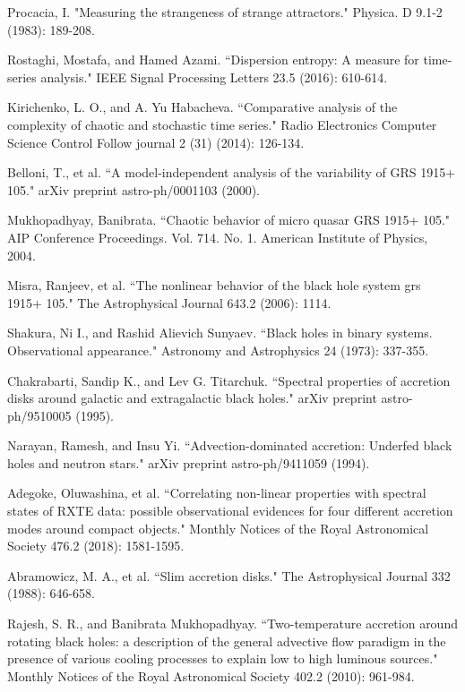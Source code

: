 \documentclass[journal]{IEEEtran}
\begin{document}
	\begin{thebibliography}{1}
		Procacia, I. "Measuring the strangeness of strange attractors." Physica. D 9.1-2 (1983): 189-208.

		Rostaghi, Mostafa, and Hamed Azami. ``Dispersion entropy: A measure for time-series analysis." IEEE Signal Processing Letters 23.5 (2016): 610-614.

Kirichenko, L. O., and A. Yu Habacheva. ``Comparative analysis of the complexity of chaotic and stochastic time series." Radio Electronics Computer Science Control  Follow journal 2 (31) (2014): 126-134.

Belloni, T., et al. ``A model-independent analysis of the variability of GRS 1915+ 105." arXiv preprint astro-ph/0001103 (2000).

Mukhopadhyay, Banibrata. ``Chaotic behavior of micro quasar GRS 1915+ 105." AIP Conference Proceedings. Vol. 714. No. 1. American Institute of Physics, 2004.

Misra, Ranjeev, et al. ``The nonlinear behavior of the black hole system grs 1915+ 105." The Astrophysical Journal 643.2 (2006): 1114.

Shakura, Ni I., and Rashid Alievich Sunyaev. ``Black holes in binary systems. Observational appearance." Astronomy and Astrophysics 24 (1973): 337-355.

Chakrabarti, Sandip K., and Lev G. Titarchuk. ``Spectral properties of accretion disks around galactic and extragalactic black holes." arXiv preprint astro-ph/9510005 (1995).

Narayan, Ramesh, and Insu Yi. ``Advection-dominated accretion: Underfed black holes and neutron stars." arXiv preprint astro-ph/9411059 (1994).

Adegoke, Oluwashina, et al. ``Correlating non-linear properties with spectral states of RXTE data: possible observational evidences for four different accretion modes around compact objects." Monthly Notices of the Royal Astronomical Society 476.2 (2018): 1581-1595.

Abramowicz, M. A., et al. ``Slim accretion disks." The Astrophysical Journal 332 (1988): 646-658.

Rajesh, S. R., and Banibrata Mukhopadhyay. ``Two-temperature accretion around rotating black holes: a description of the general advective flow paradigm in the presence of various cooling processes to explain low to high luminous sources." Monthly Notices of the Royal Astronomical Society 402.2 (2010): 961-984.


\end{thebibliography}
\end{document}
